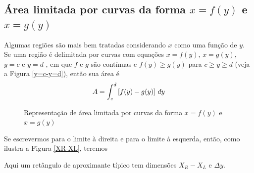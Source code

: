 \cleardoublepage\documentclass[../main.tex]{subfiles}
\begin{document}
\subsection*{Área limitada por curvas da forma $x=f(y)$ e $x=g(y)$}
Algumas regiões são mais bem tratadas considerando $x$ como uma função de $y$. Se uma região é delimitada por curvas com equações $x=f(y)$, $x=g(y)$, $y=c$ e $y=d$ , em que $f$ e $g$ são contínuas e $f(y)\geq g(y)$ para $c\geq y\geq d$ (veja a Figura \ref{y=c-y=d}), então sua área é
\begin{equation}
    A=\int_c^d \left[f(y)-g(y)\right]\, dy
\end{equation}
\begin{figure}[H]
\center
{}
\qquad
{}
\caption{Representação de área limitada por curvas da forma $x=f(y)$ e $x=g(y)$}
\label{fig:Area-entre-curvas-x=fy-gy}
\end{figure}

Se escrevermos para o limite à direita e para o limite à esquerda, então, como ilustra a Figura \ref{XR-XL}, teremos

Aqui um retângulo de aproximante típico tem dimensões $X_R-X_L$ e $\Delta y$.
\end{document}

